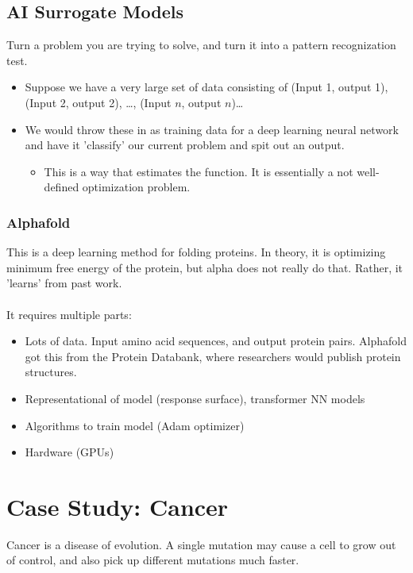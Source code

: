 \documentclass[10pt]{article}
\begin{document}
\subsection*{AI Surrogate Models}
Turn a problem you are trying to solve, and turn it into a pattern recognization test.
\begin{itemize}
	\item Suppose we have a very large set of data consisting of (Input 1, output 1), (Input 2, output 2), \dots, (Input $n$, output $n$)\dots
	\item We would throw these in as training data for a deep learning neural network and have it 'classify' our current problem and spit out an output.
	\begin{itemize}
	    \item This is a way that estimates the function.  It is essentially a not well-defined optimization problem.
    \end{itemize}
\end{itemize}

\subsubsection*{Alphafold}
This is a deep learning method for folding proteins.  In theory, it is optimizing minimum free energy of the protein, but alpha does not really do that.  Rather, it 'learns' from past work.\\\\
It requires multiple parts:
\begin{itemize}
	\item Lots of data.  Input amino acid sequences, and output protein pairs.  Alphafold got this from the Protein Databank, where researchers would publish protein structures.
	\item Representational of model (response surface), transformer NN models
	\item Algorithms to train model (Adam optimizer)
	\item Hardware (GPUs)
\end{itemize}

\section*{Case Study: Cancer}
Cancer is a disease of evolution.  A single mutation may cause a cell to grow out of control, and also pick up different mutations much faster.
\end{document}
